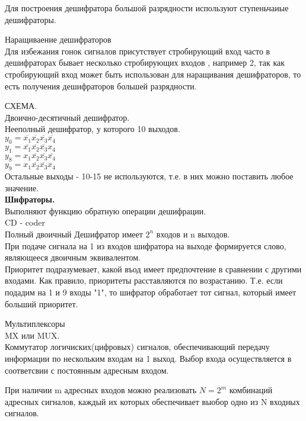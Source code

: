 Для построения дешифратора большой разрядности используют ступеньчаиые дешифраторы.

Наращиваение дешифраторов\\

Для избежания гонок сигналов присутствует стробирующий вход  часто в дешифраторах бывает несколько стробирующих входов , например 2,
так как стробирующий вход может быть использован для наращивания дешифраторов, то есть получения дешифраторов большей разрядности.

СХЕМА.\\


Двоично-десятичный дешифратор.\\
Нееполный дешифратор, у которого 10 выходов.\\
 $y_0 = \overline{x_1} \overline{x_2} \overline{x_3} \overline{x_4} $\\
 $y_1 = \overline{x_1} \overline{x_2} \overline{x_3} x_4 $\\
 $y_8 = x_1 \overline{x_2} \overline{x_3} \overline{x_4} $\\
 $y_9 = x_1 \overline{x_2} \overline{x_3} x_4 $\\
Остальные выходы - 10-15 не используются, т.е. в них можно поставить любое значение.\\

\Large{ \textbf {Шифраторы.}}\\
Выполняют функцию обратную операции дешифрации.\\
CD - coder\\
Полный  двоичный Дешифратор имеет $2^n$ входов и n выходов.\\
При подаче сигнала на 1 из входов шифратора на выходе формируется слово, являющееся двоичным эквивалентом.\\

Приоритет подразумевает, какой въод имеет предпочтение в сравнении с другими входами.
Как правило, приоритеты расставляются по возрастанию.
Т.е. если подадим на 1 и 9 входы "1", то шифратор обработает тот сигнал, который имеет больший приоритет.




Мультиплексоры\\

MX или MUX.\\
Коммутатор логичиских(цифровых) сигналов, обеспечивающий передачу информации
по нескольким входам на 1 выход. Выбор входа осуществляется в соответсвии с постоянным адресным входом.

При наличии m адресных входов можно реализовать $ N = 2^m $ комбинаций адресных сигналов,
каждый их которых обеспечивает выобор одно из N входных сигналов.

